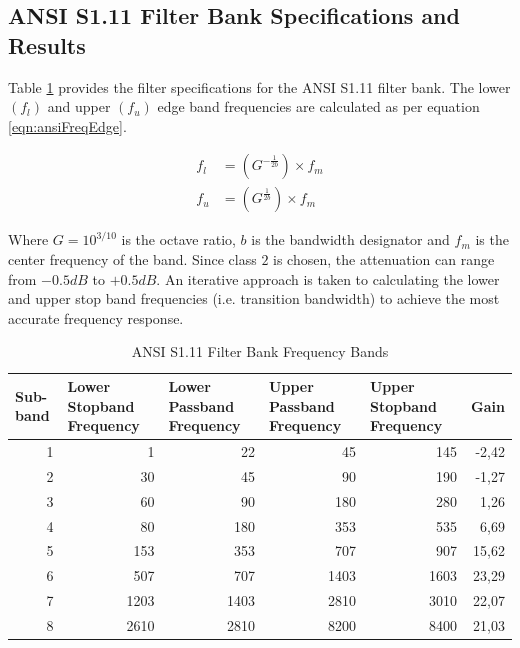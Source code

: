 \documentclass[11pt,onecolumn]{witseiepaper}
\begin{document}
\begin{appendices}
\section{ANSI S1.11 Filter Bank Specifications and Results}
\label{app:ansiSpec}

\noindent Table \ref{tab:ansiFreqSpec} provides the filter specifications for the ANSI S1.11 filter bank. The lower $(f_l)$ and upper $(f_u)$ edge band frequencies are calculated as per equation \ref{eqn:ansiFreqEdge}.

\begin{equation}
\label{eqn:ansiFreqEdge}
\begin{aligned}
f_l &= (G^{-\frac{1}{2b}}) \times f_m \\
f_u &= (G^{\frac{1}{2b}}) \times f_m
\end{aligned}
\end{equation}

\noindent Where $G = 10^{3/10}$ is the octave ratio, $b$ is the bandwidth designator and $f_m$ is the center frequency of the band. Since class $2$ is chosen, the attenuation can range from $-0.5dB$ to $+0.5dB$. An iterative approach is taken to calculating the lower and upper stop band frequencies (i.e. transition bandwidth) to achieve the most accurate frequency response.	

\begin{table}[htbp]
  \centering
  \caption{ANSI S1.11 Filter Bank Frequency Bands}
  \begin{adjustbox}{width=0.9\linewidth}
    \begin{tabular}{|r|r|r|r|r|r|}
    \hline
    \multicolumn{1}{|l|}{\textbf{Sub-band}} & \multicolumn{1}{l|}{\textbf{Lower Stopband Frequency}} & \multicolumn{1}{l|}{\textbf{Lower Passband Frequency}} & \multicolumn{1}{l|}{\textbf{Upper Passband Frequency}} & \multicolumn{1}{l|}{\textbf{Upper Stopband Frequency}} & \multicolumn{1}{l|}{\textbf{Gain}} \\
    \hline
    1     & 1     & 22    & 45    & 145   & -2,42 \\
    \hline
    2     & 30    & 45    & 90    & 190   & -1,27 \\
    \hline
    3     & 60    & 90    & 180   & 280   & 1,26 \\
    \hline
    4     & 80    & 180   & 353   & 535   & 6,69 \\
    \hline
    5     & 153   & 353   & 707   & 907   & 15,62 \\
    \hline
    6     & 507   & 707   & 1403  & 1603  & 23,29 \\
    \hline
    7     & 1203  & 1403  & 2810  & 3010  & 22,07 \\
    \hline
    8     & 2610  & 2810  & 8200  & 8400  & 21,03 \\
    \hline
    \end{tabular}%
    \end{adjustbox}
  \label{tab:ansiFreqSpec}%
\end{table}%


\end{appendices}
\end{document}
